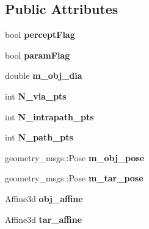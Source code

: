 \subsection*{Public Attributes}
\begin{DoxyCompactItemize}
\item 
\mbox{\label{classTool__Expt_a1dda864e4413125a1eb1e335171c9487}} 
bool {\bfseries percept\+Flag}
\item 
\mbox{\label{classTool__Expt_ab9b881e79fbe7c802c1fee961a67edb7}} 
bool {\bfseries param\+Flag}
\item 
\mbox{\label{classTool__Expt_a4e85b2c1eeb6df93475a1b91d2814cf0}} 
double {\bfseries m\+\_\+obj\+\_\+dia}
\item 
\mbox{\label{classTool__Expt_a39bd18941664411fbdc58dfdc5e08247}} 
int {\bfseries N\+\_\+via\+\_\+pts}
\item 
\mbox{\label{classTool__Expt_a8ca80d494109ba43354e8ba6b4860c24}} 
int {\bfseries N\+\_\+intrapath\+\_\+pts}
\item 
\mbox{\label{classTool__Expt_a76afe1d39cf6c333f874a994df98ad71}} 
int {\bfseries N\+\_\+path\+\_\+pts}
\item 
\mbox{\label{classTool__Expt_a1168be1098d4588f88898980d05d20f3}} 
geometry\+\_\+msgs\+::\+Pose {\bfseries m\+\_\+obj\+\_\+pose}
\item 
\mbox{\label{classTool__Expt_a6ae2cc487858888b1b618cc663945790}} 
geometry\+\_\+msgs\+::\+Pose {\bfseries m\+\_\+tar\+\_\+pose}
\item 
\mbox{\label{classTool__Expt_a4b0b77f19ef13848df7d207df0eb4e17}} 
Affine3d {\bfseries obj\+\_\+affine}
\item 
\mbox{\label{classTool__Expt_a19a6a35069a280a506705386e4ccb808}} 
Affine3d {\bfseries tar\+\_\+affine}
\item 
\mbox{\label{classTool__Expt_a06d1e46d87e5f9bad285be4d3c8564cf}} 

\end{DoxyCompactItemize}
